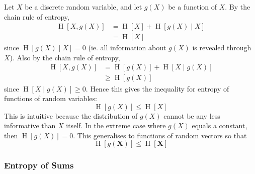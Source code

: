 \documentclass[11pt]{report} %
\begin{document}
Let $X$ be a discrete random variable, and let $g\left(X\right)$ be a function of $X$. By the chain rule of entropy,
\begin{align}
\operatorname{H}\left[X, g\left(X\right)\right] &= \operatorname{H}\left[X\right] + \operatorname{H}\left[g\left(X\right)\middle|X\right] \\
&= \operatorname{H}\left[X\right]
\end{align}
since $\operatorname{H}\left[g\left(X\right)\middle|X\right] = 0$ (ie. all information about $g\left(X\right)$ is revealed through $X$). Also by the chain rule of entropy,
\begin{align}
\operatorname{H}\left[X, g\left(X\right)\right] &= \operatorname{H}\left[g\left(X\right)\right] + \operatorname{H}\left[X\middle|g\left(X\right)\right] \\
&\geq \operatorname{H}\left[g\left(X\right)\right]
\end{align}
since $\operatorname{H}\left[X\middle|g\left(X\right)\right]  \geq 0$. Hence this gives the inequality for entropy of functions of random variables:
\begin{equation}
\operatorname{H}\left[g\left(X\right)\right] \leq \operatorname{H}\left[X\right]
\end{equation}
This is intuitive because the distribution of $g\left(X\right)$ cannot be any less informative than $X$ itself. In the extreme case where $g\left(X\right)$ equals a constant, then $\operatorname{H}\left[g\left(X\right)\right] = 0$. This generalises to functions of random vectors so that
\begin{equation}
\operatorname{H}\left[g\left(\mathbf{X}\right)\right] \leq \operatorname{H}\left[\mathbf{X}\right]
\end{equation}

\subsubsection{Entropy of Sums}
\end{document}
